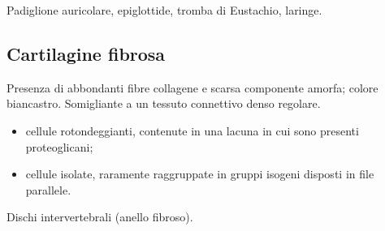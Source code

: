 Padiglione auricolare, epiglottide, tromba di Eustachio, laringe.

\subsection{Cartilagine fibrosa}

Presenza di abbondanti fibre collagene e scarsa componente amorfa; colore biancastro. Somigliante a un tessuto connettivo denso regolare.
\begin{itemize}
  \item cellule rotondeggianti, contenute in una lacuna in cui sono presenti proteoglicani;
  \item cellule isolate, raramente raggruppate in gruppi isogeni disposti in file parallele.
\end{itemize}

Dischi intervertebrali (anello fibroso).
